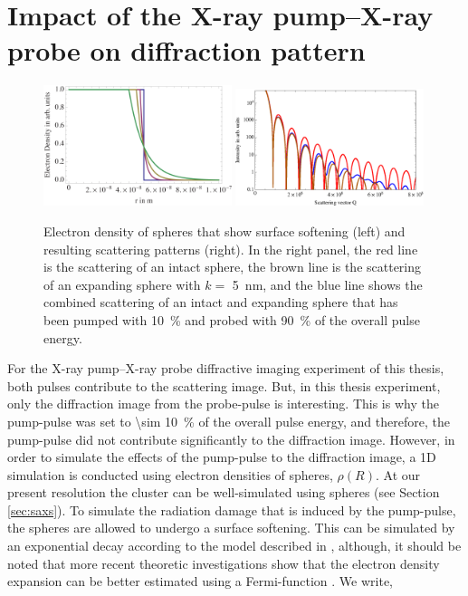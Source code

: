 \section{Impact of the X-ray pump--X-ray probe on diffraction pattern}\label{sec:pump--probe-considerations}
\begin{figure}
	\centering
		\includegraphics[width=0.49\textwidth]{images/electron-density-convoluted-object.png}
		\includegraphics[width=0.49\textwidth]{images/beam-convoluted-with-object.eps}
	\caption[Influence of X-ray pump--X-ray probe pulses to a diffraction image.]{Electron density of spheres that show surface softening (left) and resulting scattering patterns (right). In the right panel, the red line is the scattering of an intact sphere, the brown line is the scattering of an expanding sphere with $k=$ \SI{5}{\nano\meter}, and the blue line shows the combined scattering of an intact and expanding sphere that has been pumped with \SI{10}{\percent} and probed with \SI{90}{\percent} of the overall pulse energy.}
	\label{fig:electron-density-convoluted-object}
\end{figure}
For the X-ray pump--X-ray probe diffractive imaging experiment of this thesis, both pulses contribute to the scattering image. But, in this thesis experiment, only the diffraction image from the probe-pulse is interesting. This is why the pump-pulse was set to \SI{\sim 10}{\percent} of the overall pulse energy, and therefore, the pump-pulse did not contribute significantly to the diffraction image. However, in order to simulate the effects of the pump-pulse to the diffraction image, a 1D simulation is conducted using electron densities of spheres, $\rho\left(R\right)$. At our present resolution the cluster can be well-simulated using spheres (see Section \ref{sec:saxs}). To simulate the radiation damage that is induced by the pump-pulse, the spheres are allowed to undergo a surface softening. This can be simulated by an exponential decay according to the model described in \cite{Gorkhover-2016-NatPho}, although, it should be noted that more recent theoretic investigations show that the electron density expansion can be better estimated using a Fermi-function \cite{Peltz-2014-PRL}. We write,
